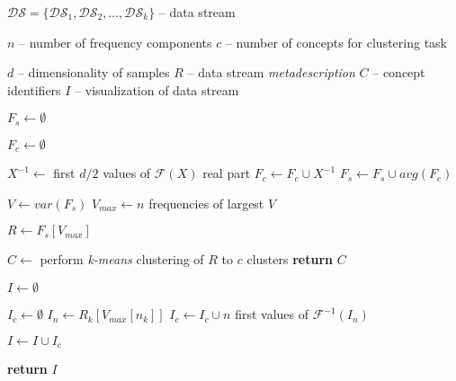 
\begin{algorithmic}[1]
\Statex $\mathcal{DS} = \{\mathcal{DS}_1, \mathcal{DS}_2, \ldots, \mathcal{DS}_k\}$ -- data stream

{\color{gray}}

\Statex $n$ -- number of frequency components
\Statex $c$ -- number of concepts for clustering task

{\color{gray}}

\Statex $d$ -- dimensionality of samples
\Statex $R$ -- data stream \textit{metadescription}
\Statex $C$ -- concept identifiers
\Statex $I$ -- visualization of data stream


\vspace{1em}

\State $F_s \gets \emptyset$

    
    \State $F_c \gets \emptyset$

        {\color{gray}}
        \State $X^{-1} \gets$ first $d/2$ values of $\mathcal{F}(X)$ real part
        \State $F_c \gets F_c \cup X^{-1}$
        \EndFor
    {\color{gray}}
    \State $F_s \gets F_s \cup avg(F_c)$

    \EndFor
    {\color{gray}}

    \State $V \gets var(F_s)$
    \State $V_{max} \gets n $ frequencies of largest $V$
    
    \State $R \gets F_s[V_{max}]$
    {\color{gray}}

        \State $C \gets$ perform \emph{k-means} clustering of $R$ to $c$ clusters
        \State \textbf{return} $C$

    \EndIf
    {\color{gray}}

        \State $I \gets \emptyset$

            \State $I_c \gets \emptyset$
            {\color{gray}}
            \State $I_n \gets R_k[V_{max}[n_k]]$ 
            {\color{gray}}
            \State $I_c \gets I_c \cup n$ first values of $ \mathcal{F}^{-1}(I_n)$
            \EndFor
        
        \State $I \gets I \cup I_c$
        \EndFor
        
        \State \textbf{return} $I$

    \EndIf
    
\end{algorithmic}